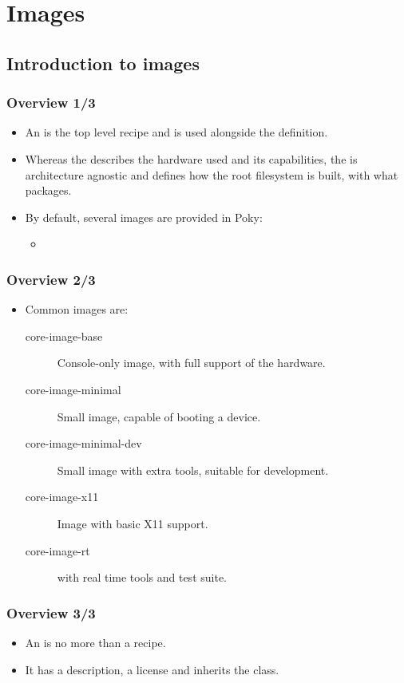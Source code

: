 \section{Images}
\subsection{Introduction to images}

\begin{frame}
  \frametitle{Overview 1/3}
  \begin{itemize}
    \item An  is the top level recipe and is used
      alongside the  definition.
    \item Whereas the  describes the hardware used and
      its capabilities, the  is architecture agnostic and
      defines how the root filesystem is built, with what packages.
    \item By default, several images are provided in Poky:
      \begin{itemize}
        \item {}
      \end{itemize}
  \end{itemize}
\end{frame}

\begin{frame}
  \frametitle{Overview 2/3}
  \begin{itemize}
    \item Common images are:
      \begin{description}
        \item[core-image-base] Console-only image, with full support
          of the hardware.
        \item[core-image-minimal] Small image, capable of booting a
          device.
        \item[core-image-minimal-dev] Small image with extra tools,
          suitable for development.
        \item[core-image-x11] Image with basic X11 support.
        \item[core-image-rt]  with real time
          tools and test suite.
      \end{description}
  \end{itemize}
\end{frame}

\begin{frame}
  \frametitle{Overview 3/3}
  \begin{itemize}
    \item An  is no more than a recipe.
    \item It has a description, a license and inherits the
       class.
  \end{itemize}
\end{frame}

